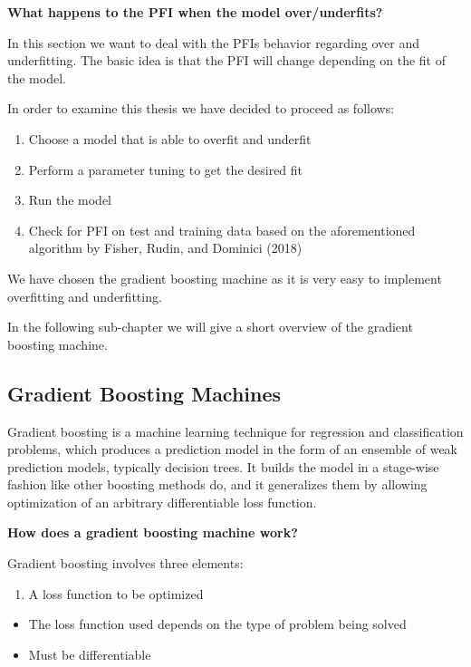 \documentclass[]{krantz}
\providecommand{\tightlist}{%
  \setlength{\itemsep}{0pt}\setlength{\parskip}{0pt}}
\begin{document}
\textbf{What happens to the PFI when the model over/underfits?}

In this section we want to deal with the PFIs behavior regarding over
and underfitting. The basic idea is that the PFI will change depending
on the fit of the model.

In order to examine this thesis we have decided to proceed as follows:

\begin{enumerate}
\def\labelenumi{\arabic{enumi}.}
\item
  Choose a model that is able to overfit and underfit
\item
  Perform a parameter tuning to get the desired fit
\item
  Run the model
\item
  Check for PFI on test and training data based on the aforementioned
  algorithm by Fisher, Rudin, and Dominici (2018)
\end{enumerate}

We have chosen the gradient boosting machine as it is very easy to
implement overfitting and underfitting.

In the following sub-chapter we will give a short overview of the
gradient boosting machine.

\subsection{Gradient Boosting
Machines}\label{gradient-boosting-machines}

Gradient boosting is a machine learning technique for regression and
classification problems, which produces a prediction model in the form
of an ensemble of weak prediction models, typically decision trees. It
builds the model in a stage-wise fashion like other boosting methods do,
and it generalizes them by allowing optimization of an arbitrary
differentiable loss function.

\textbf{How does a gradient boosting machine work?}

Gradient boosting involves three elements:

\begin{enumerate}
\def\labelenumi{\arabic{enumi}.}
\tightlist
\item
  A loss function to be optimized
\end{enumerate}

\begin{itemize}
\tightlist
\item
  The loss function used depends on the type of problem being solved
\item
  Must be differentiable
\end{itemize}
\end{document}
